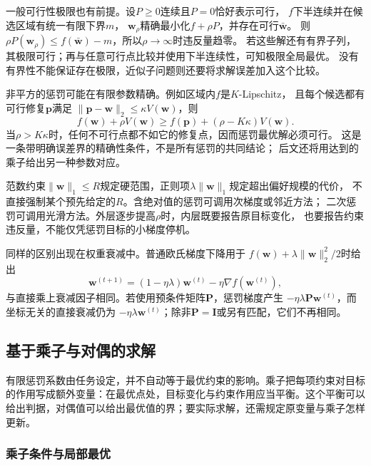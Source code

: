 一般可行性极限也有前提。设$P\geq0$连续且$P=0$恰好表示可行，
$f$下半连续并在候选区域有统一有限下界$m$，
$\bm w_\rho$精确最小化$f+\rho P$，并存在可行$\bar{\bm w}$。
则$\rho P(\bm w_\rho)\leq f(\bar{\bm w})-m$，所以$\rho\to\infty$时违反量趋零。
若这些解还有有界子列，其极限可行；再与任意可行点比较并使用下半连续性，可知极限全局最优。
没有有界性不能保证存在极限，近似子问题则还要将求解误差加入这个比较。

非平方的惩罚可能在有限参数精确。例如区域内$f$是$K$-Lipschitz，
且每个候选都有可行修复$\bm p$满足
$\|\bm p-\bm w\|_2\leq\kappa V(\bm w)$，则
\[
 f(\bm w)+\rho V(\bm w)
 \geq f(\bm p)+(\rho-K\kappa)V(\bm w).
\]
当$\rho>K\kappa$时，任何不可行点都不如它的修复点，因而惩罚最优解必须可行。
这是一条带明确误差界的精确性条件，不是所有惩罚的共同结论；
后文还将用达到的乘子给出另一种参数对应。

范数约束$\|\bm w\|_1\leq R$规定硬范围，正则项$\lambda\|\bm w\|_1$规定超出偏好规模的代价，
不直接强制某个预先给定的$R$。含绝对值的惩罚可调用次梯度或邻近方法；
二次惩罚可调用光滑方法。外层逐步提高$\rho$时，内层既要报告原目标变化，
也要报告约束违反量，不能仅凭惩罚目标的小梯度停机。

同样的区别出现在权重衰减中。普通欧氏梯度下降用于
$f(\bm{w})+\lambda\lVert\bm{w}\rVert_2^2/2$时给出
\[
  \bm{w}^{(t+1)}
  =(1-\eta\lambda)\bm{w}^{(t)}-\eta\nabla f(\bm{w}^{(t)}),
\]
与直接乘上衰减因子相同。若使用预条件矩阵$\bm{P}$，惩罚梯度产生
$-\eta\lambda\bm{P}\bm{w}^{(t)}$，而坐标无关的直接衰减仍为
$-\eta\lambda\bm{w}^{(t)}$；除非$\bm{P}=\bm{I}$或另有匹配，它们不再相同。

\subsection{基于乘子与对偶的求解}
\label{sec:opt-multiplier-dual-methods}

有限惩罚系数由任务设定，并不自动等于最优约束的影响。乘子把每项约束对目标的作用写成额外变量：在最优点处，目标变化与约束作用应当平衡。这个平衡可以给出判据，对偶值可以给出最优值的界；要实际求解，还需规定原变量与乘子怎样更新。

\subsubsection{乘子条件与局部最优}
\label{sec:opt-kkt}

